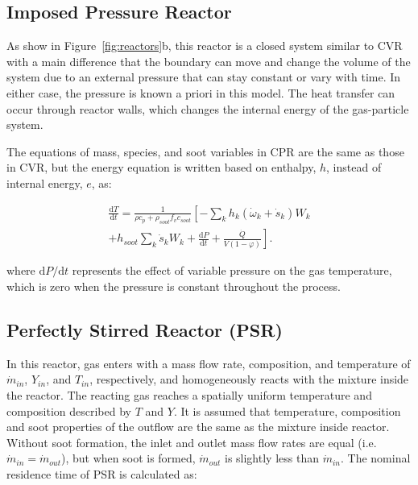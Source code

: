 \subsection{Imposed Pressure Reactor}

As show in Figure~\ref{fig:reactors}b, this reactor is a closed system similar to CVR with a main difference that the boundary can move and change the volume of the system due to an external pressure that can stay constant or vary with time. In either case, the pressure is known a priori in this model. The heat transfer can occur through reactor walls, which changes the internal energy of the gas-particle system.

The equations of mass, species, and soot variables in CPR are the same as those in CVR, but the energy equation is written based on enthalpy, $h$, instead of internal energy, $e$, as:

\begin{equation}
	\begin{split}
		\frac{\mathrm{d} T}{\mathrm{d} t}=
		\frac{1}{\rho c_p+\rho_{soot}f_v c_{soot}}
		\left[
		-\sum_k h_k
		\left(
		\dot{\omega}_k+\dot{s}_k
		\right) W_k \right. \\
		\left.
		+h_{soot}\sum_k \dot{s}_k W_k
		+\frac{\mathrm{d}P}{\mathrm{d}t}
		+\frac{\dot{Q}}{V(1-\varphi)}
		\right]
		\label{eqn:energypressure}.
	\end{split}
\end{equation}


\noindent where $\mathrm{d}P/\mathrm{d}t$ represents the effect of variable pressure on the gas temperature, which is zero when the pressure is constant throughout the process.


\subsection{Perfectly Stirred Reactor (PSR)}
In this reactor, gas enters with a mass flow rate, composition, and temperature of $\dot{m}_{in}$, $Y_{in}$, and $T_{in}$, respectively, and homogeneously reacts with the mixture inside the reactor. The reacting gas reaches a spatially uniform temperature and composition described by $T$ and $Y$. It is assumed that temperature, composition and soot properties of the outflow are the same as the mixture inside reactor. Without soot formation, the inlet and outlet mass flow rates are equal (i.e. ${\dot{m}_{in}}={\dot{m}_{out}}$), but when soot is formed, ${\dot{m}_{out}}$ is slightly less than ${\dot{m}_{in}}$. The nominal residence time of PSR is calculated as:

